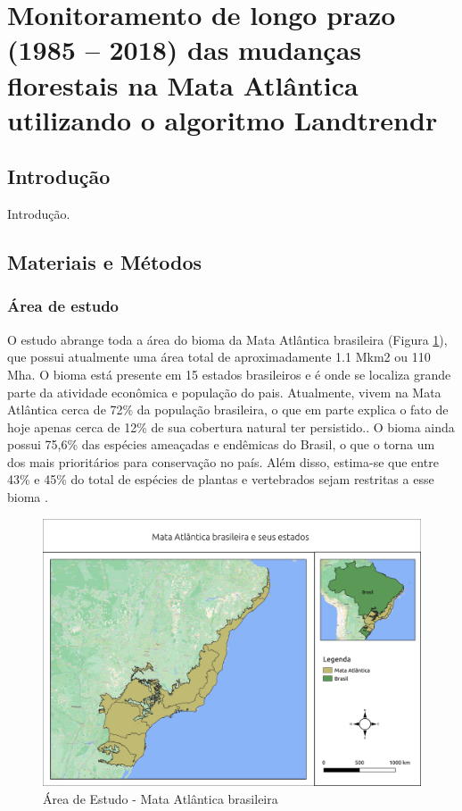 \section{Monitoramento de longo prazo (1985 – 2018) das mudanças florestais na Mata Atlântica utilizando o algoritmo Landtrendr}
\subsection{Introdução}
\hspace{13pt} Introdução.

\subsection{Materiais e Métodos}
\subsubsection{Área de estudo}
\hspace{13pt} O estudo abrange toda a área do bioma da Mata Atlântica brasileira (Figura \ref{fig:mata_atlantica}), que possui atualmente uma área total de aproximadamente 1.1 Mkm2 ou 110 Mha. O bioma está presente em 15 estados brasileiros e é onde se localiza grande parte da atividade econômica e população do pais. Atualmente, vivem na Mata Atlântica cerca de 72\% da população brasileira, o que em parte explica o fato de hoje apenas cerca de 12\% de sua cobertura natural ter persistido.. O bioma ainda possui 75,6\% das espécies ameaçadas e endêmicas do Brasil, o que o torna um dos mais prioritários para conservação no país. Além disso, estima-se que entre 43\% e 45\% do total de espécies de plantas e vertebrados sejam restritas a esse bioma \citep{scarano2014}.

\begin{figure}[h!]
    \centering
    \includegraphics[scale=.5]{images/mata_atlantica.png}
    \caption{Área de Estudo - Mata Atlântica brasileira}
    \label{fig:mata_atlantica}
\end{figure}

